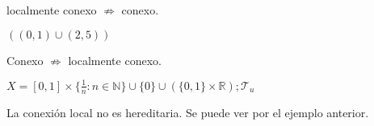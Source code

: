 \begin{obs}
  localmente conexo $\not \Rightarrow$ conexo.
\end{obs}

\begin{ejm}
  $((0,1) \cup (2, 5))$
\end{ejm}

\begin{obs}
  Conexo $\not \Rightarrow$ localmente conexo.
\end{obs}

\begin{ejm}
  $X = [0, 1] \times \{ \frac{1}{n} : n \in \mathbb{N} \} \cup \{ 0 \} \cup (\{ 0, 1 \} \times \mathbb{R}) ; \mathcal{T}_{u}$
\end{ejm}

\begin{obs}
  La conexión local no es hereditaria. Se puede ver por el ejemplo anterior.
\end{obs}
